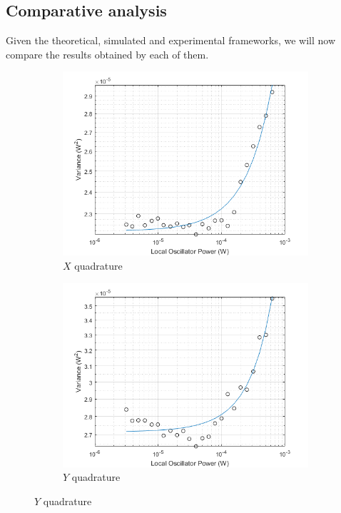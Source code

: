 \begin{bibunit}[plain]
\subsection{Comparative analysis}
%
%
Given the theoretical, simulated and experimental frameworks, we will now compare the results obtained by each of them.
\\
%
\begin{figure}[H]
	\begin{subfigure}{.5\textwidth}
		\centering
		\includegraphics[width=.8\linewidth]{./sdf/optical_detection/figures/noise_exp_channel1.png}
		\caption{$X$ quadrature}
		\label{fig:noise-exp-1}
	\end{subfigure}%
	\begin{subfigure}{.5\textwidth}
		\centering
		\includegraphics[width=.8\linewidth]{./sdf/optical_detection/figures/noise_exp_channel3.png}
		\caption{$Y$ quadrature}
		\label{fig:noise-exp-3}
	\end{subfigure}
	\captionsetup{justification=centering}

\end{figure}
\end{bibunit}
